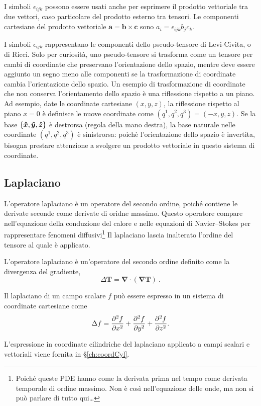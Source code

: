   \begin{remark}
   I simboli $\epsilon_{ijk}$ possono essere usati anche per esprimere il prodotto vettoriale tra due vettori, caso particolare del prodotto esterno tra tensori. Le componenti cartesiane del prodotto vettoriale $\bm{a} = \bm{b} \times \bm{c}$ sono $a_i = \epsilon_{ijk} b_j c_k$.
  \end{remark}
  \begin{remark}
   I simboli $\epsilon_{ijk}$ rappresentano le componenti dello pseudo-tensore di Levi-Civita, o di Ricci. Solo per curiosità, uno pseudo-tensore si trasforma come un tensore per cambi di coordinate che preservano l'orientazione dello spazio, mentre deve essere aggiunto un segno meno alle componenti se la trasformazione di coordinate cambia l'orientazione dello spazio. Un esempio di trasformazione di coordinate che non conserva l'orientamento dello spazio è una riflessione rispetto a un piano. Ad esempio, date le coordinate cartesiane $(x,y,z)$, la riflessione rispetto al piano $x=0$ è definisce le nuove coordinate come $(q^1,q^2,q^3) = (-x,y,z)$. Se la base $\{\bm{\hat{x}},\bm{\hat{y}},\bm{\hat{z}}\}$ è destrorsa (regola della mano destra), la base naturale nelle coordinate $(q^1,q^2,q^3)$ è sinistrorsa: poichè l'orientazione dello spazio è invertita, bisogna prestare attenzione a svolgere un prodotto vettoriale in questo sistema di coordinate.
  \end{remark}
 
\subsection{Laplaciano}
L'operatore laplaciano è un operatore del secondo ordine, poiché contiene le derivate seconde come derivate di oridne massimo. Questo operatore compare nell'equazione della conduzione del calore e nelle equazioni di Navier--Stokes per rappresentare fenomeni diffusivi\footnote{Poiché queste PDE hanno come la derivata prima nel tempo come derivata temporale di ordine massimo. Non è così nell'equazione delle onde, ma non si può parlare di tutto qui\dots}
 Il laplaciano lascia inalterato l'ordine del tensore al quale è applicato. 
 \begin{operator}[Laplaciano] L'operatore laplaciano è un'operatore del secondo ordine definito come la divergenza del gradiente,
 \begin{equation}
  \Delta \bm{T} = \bm{\nabla} \cdot (\bm{\nabla} \bm{T}) \ .
 \end{equation}
 \end{operator}
 \begin{example}
  Il laplaciano di un campo scalare $f$ può essere espresso in un sistema di coordinate cartesiane come
  \begin{equation}
   \Delta f = \dfrac{\partial^2 f}{\partial x^2} + \dfrac{\partial^2 f}{\partial y^2} + \dfrac{\partial^2 f}{\partial z^2}.
  \end{equation}
 \end{example}
 \begin{example}
  L'espressione in coordinate cilindriche del laplaciano applicato a campi scalari e vettoriali viene fornita in \S\ref{ch:coordCyl}.
 \end{example} 
 

